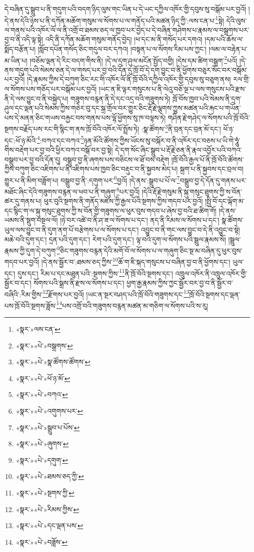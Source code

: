 དེ་བཞིན་དུ་སྒྲུབ་པ་ནི་གདུག་པའི་བདག་ཉིད་ལུས་གང་ཡིན་པ་དེ་ཡང་དཀྱིལ་འཁོར་གྱི་དབུས་སུ་བསྒོམ་པར་བྱའོ། །དེ་ནས་དེའི་ཉེས་པ་ནི་དཀོན་མཆོག་གསུམ་ལ་སོགས་པ་ལ་གནོད་པའི་མཚན་ཉིད་ཀྱི་:ལས་ངན་པ་\footnote{«སྣར་»ལས་ངན་}སྟེ། དེའི་ལུས་ལ་གནས་པའི་འཁོར་ལོ་ལ་ནི་འགྲོ་བ་ཐམས་ཅད་ལ་ཁྱབ་པར་བྱེད་པ་དེ་བཞིན་གཤེགས་པ་རྣམས་ལ་བསྒྲགས་པར་བྱ་བ་ནི་འདི་ལྟ་སྟེ། འདི་ནི་དཀོན་མཆོག་གསུམ་གནོད་བྱེད། །ཕ་དང་མ་ནི་གསོད་པར་དགའ། །དམ་པའི་ཆོས་ལ་སྨོད་བརྩོན་པ། །སློབ་དཔོན་གསོད་ཅིང་གདུལ་བར་དཀའ། །བསྟན་པ་ལ་སོགས་རིམ་པས་ཀྱང་། །ལམ་ལ་བརྟེན་པ་མ་ཡིན་པ། །བཅོམ་ལྡན་དེ་རིང་བདག་གིས་ནི། །དེ་ལ་དྲག་ཤུལ་མངོན་སྤྱོད་བགྱི། །དེས་དམ་ཚིག་བསྒྲག་\footnote{«སྣར་»«པེ་»བསྒྲགས་}པའོ། །དེ་ནས་གདུག་པའི་སེམས་ཅན་དེ་ལ་གསད་པར་བྱ་བའི་དོན་དུ་ཁྲོ་བོ་དེ་དག་བྱུང་བ་ནི་ཕྱོགས་བཅུར་སོང་བར་བསྒོམ་པར་བྱའོ། །དེ་རྣམས་ཀྱིས་དེ་བཀུག་ཅིང་རང་གི་འཁོར་ལོ་ནི་ཁྲོ་བོའི་དཀྱིལ་འཁོར་གྱི་དབུས་སུ་བཅུག་ནས། རལ་གྲི་ལ་སོགས་པས་གཅོད་པར་བསྒོམ་པར་བྱའོ། །ཡང་ན་ཇི་ལྟར་གསུངས་པ་ནི་ལེའུ་བཅོ་ལྔ་པ་ལས་གསུངས་པའི་རྫས་ནི་དེ་ལས་བྱུང་བ་ནི་བསྐྱེད་པ། གཟུགས་བརྙན་ནི་དེ་དང་འདྲ་བའི་གཟུགས་ཏེ། ཁྲོ་བོས་ཁྱབ་པའི་སེམས་ནི་དྲག་ཤུལ་དང་ལྡན་པའི་སེམས་ཀྱིས་གཅེར་བུ་དང་སྐྲ་གྲོལ་བར་གྱུར་ཅིང་རྡོ་རྗེ་ལྕགས་ཀྱུས་མཚན་པའི་རྐང་པ་གཡོན་པས་དེ་མནན་ཅིང་གཡས་བརྐྱང་བས་གནས་པས་ལྷོ་ཕྱོགས་སུ་ཁ་བལྟས་ཏེ། གཤིན་རྗེ་གཤེད་ལ་སོགས་པའི་ཁྲོ་བོའི་སྔགས་བརྗོད་པས་རང་གི་སྙིང་ག་ནས་ཁྲོ་བོའི་འཁོར་ལོ་སྤྲོས་ཏེ། :སྣ་ཚོགས་\footnote{«སྣར་»«པེ་»སྣ་ཚོགས་ཚོགས་}ནི་བྲན་དང་བྲན་མོ་དང་། ཕོ་ཉ་དང་:ཕོ་ཉ་མོའི་\footnote{«སྣར་»«པེ་»ཕོ་ཉ་མོ་}:བཀའ་དང་བཀའ་\footnote{«སྣར་»«པེ་»བཀའ་}ཉན་མོའི་ཚོགས་ཀྱིས་ཡོངས་སུ་བསྐོར་བ་ནི་འཁོར་དང་བཅས་པ་ཡི་གེ་ཧཱུཾ་གིས་བརྡེག་པར་བྱ་བའི་ཕྱིར་བཀའ་བསྒོ་བར་བྱ་སྟེ། དེ་དག་སོང་ཞིང་སྒྲུབ་པ་རྡོ་རྗེ་ཅན་ནི་རྣལ་འབྱོར་པའི་བཀའ་བསྒྲུབ་པར་བྱ་བའི་དོན་དུ། བསྒྲུབ་བྱ་ནི་ཞགས་པས་བཅིངས་ལ་ཐོ་བས་བརྡེག །ཁྲོ་བོའི་རྒྱལ་པོ་ནི་ཁྲོ་བོའི་ཚོགས་ཀྱིས་བཀུག་ཅིང་འཇིགས་པ་ནི་འཇིགས་པས་ཁྱབ་ཅིང་བརྡུང་བ་ནི་སྐྱབས་མེད་པ། སྐྲག་པ་ནི་སྐྱབས་དང་བྲལ་བ། གྱུར་པ་ནི་མིག་བཟློག་པ། བསྒྲུབ་བྱ་ནི་:དགུག་པར་\footnote{«སྣར་»«པེ་»འགུགས་པར་}བྱའོ། །དེ་ནས་:སྒྲུབ་པ་པོ་ལ་\footnote{«སྣར་»«པེ་»སྒྲུབ་པ་པོས་}བསྒྲུབ་བྱ་དེ་དོན་དུ་གནས་པར་མཐོང་ཞིང་དེའི་གཟུགས་བརྙན་ལ་ཕབ་པ་ནི་གཞུག་\footnote{«སྣར་»«པེ་»ཞུགས་}པར་བྱའོ། །དེའི་རྡོ་རྗེ་གསུམ་ནི་སྐུ་གསུང་ཐུགས་ཀྱི་ས་བོན་ཚར་དུ་གནས་པ། ཕུར་བུའི་སྔགས་ནི་གནོད་མཛེས་ཀྱི་རྒྱལ་པོའི་སྔགས་ཀྱིས་གདབ་པར་བྱའོ། །སྤྱི་བོ་དང་ལྐོག་མ་དང་སྙིང་ག་ལ་སྐུ་གསུང་ཐུགས་ཀྱི་ས་བོན་གྱི་གཟུགས་ལ་ཕུར་བུས་གདབ་པ་ཞེས་བྱ་བའི་ཐ་ཚིག་གོ། །དེ་ནས་ཡམས་ནི་སྡུག་བསྔལ་ལོ། །ཉེ་བར་འཚེ་བ་ནི་ཤ་ཟ་ལ་སོགས་པ་དང་། ནད་ནི་རིམས་ལ་སོགས་པ་དང་། སྣ་ཚོགས་ཡུལ་ལས་བྱུང་བ་ནི་དུག་ནག་པོ་བརྩེགས་པ་ལ་སོགས་པ་དང་། འབྱུང་བ་ནི་གང་ལས་བྱུང་བ་དེ་ནི་འབྱུང་བ་སྟེ། མཆེ་བའི་དུག་དང་། དྲན་པའི་དུག་དང་། རེག་པའི་དུག་དང་། ལྟ་བའི་དུག་ལ་སོགས་པའི་སྦྲུལ་རྣམས་སོ། །སྦྲུལ་རྣམས་ཀྱི་དུག་དེ་བཀུག་\footnote{«སྣར་»«པེ་»དགུག་}ཅིང་གཟུགས་བརྙན་དེའི་མགོ་བོ་ལ་སོགས་པ་ལ་གཞུག་ཅིང་སྔ་མ་བཞིན་དུ་ཕུར་བུས་གདབ་པར་བྱའོ། །དེ་ནས་སྦྱོར་བ་:ཐམས་ཅད་ཀྱིས་\footnote{«སྣར་»«པེ་»ཐམས་ཅད་ཀྱི་}ཆོ་ག་ཇི་སྐད་གསུངས་པ་བཞིན་བྱ་བ་ནི་ཕྱོགས་དང་། ཡུལ་དང་། དུས་དང་། རིམ་པ་དང་མཐུན་པའི་:སྔགས་ཀྱིས་\footnote{«སྣར་»«པེ་»སྔགས་ཀྱི་}ནི་ཁྲོ་བོའི་སྔགས་དང་། འཁྲུལ་འཁོར་ནི་འཁྲུལ་འཁོར་གྱི་སྦྱོར་བ་དང་། སོགས་པའི་སྒྲས་ནི་རྫས་ལ་སོགས་པ་དང་། ཕྱག་རྒྱ་རྣམས་ཀྱིས་ཀྱང་སྦྱོར་བར་བྱ་བ་ནི་སྦྱོར་བ་བཞིའི་:རིམ་གྱིས་\footnote{«སྣར་»«པེ་»རིམས་ཀྱིས་}རྫོགས་པར་བྱའོ། །ཡང་ན་སྔར་བཤད་པའི་ཁྲོ་བོའི་གཟུགས་དང་\footnote{«སྣར་»«པེ་»དང་ལྡན་པས་}ཁྲོ་བོའི་སྔགས་དང་ལྡན་པས་ཁྲོ་བོའི་སྔགས་ཟློས་\footnote{«སྣར་»«པེ་»བཟློས་}པས་འགྲོ་བའི་གཟུགས་བརྙན་མཚན་མ་གཅིག་ལ་སོགས་པའི་ས་རུ། 
